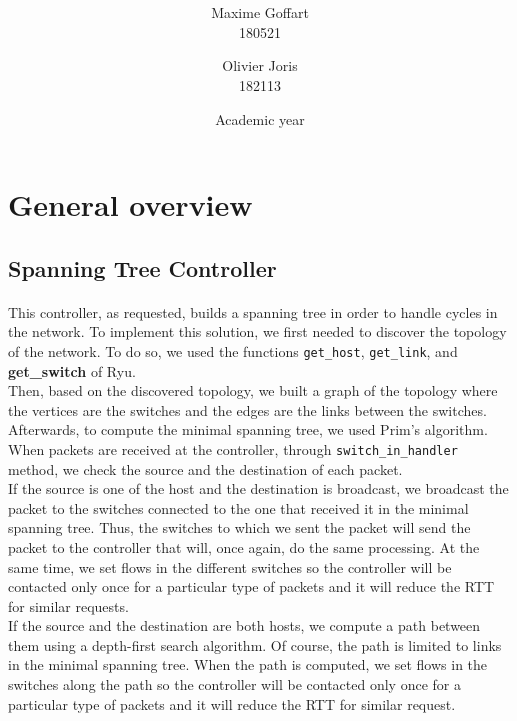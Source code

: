 \documentclass[a4paper, 11pt, oneside]{article}
\title{\ClassName\\\vspace*{0.8cm}\ProjectName\vspace{1cm}}
\author{Maxime Goffart \\180521 \and Olivier Joris\\182113}
\date{\vspace{1cm}Academic year \AcademicYear}
\begin{document}
\begin{titlingpage}
{\let\newpage\relax\maketitle}
\end{titlingpage}

\thispagestyle{empty}
\newpage


\section{General overview}

\subsection{Spanning Tree Controller}
\paragraph{}This controller, as requested, builds a spanning tree in order to handle cycles in the network. To implement this solution, we first needed to discover the topology of the network. To do so, we used the functions \texttt{get\_host}, \texttt{get\_link}, and \textbf{get\_switch} of Ryu.\\
Then, based on the discovered topology, we built a graph of the topology where the vertices are the switches and the edges are the links between the switches. Afterwards, to compute the minimal spanning tree, we used Prim's algorithm.\\
\indent When packets are received at the controller, through \texttt{switch\_in\_handler} method, we check the source and the destination of each packet.\\
If the source is one of the host and the destination is broadcast, we broadcast the packet to the switches connected to the one that received it in the minimal spanning tree. Thus, the switches to which we sent the packet will send the packet to the controller that will, once again, do the same processing. At the same time, we set flows in the different switches so the controller will be contacted only once for a particular type of packets and it will reduce the RTT for similar requests.\\
If the source and the destination are both hosts, we compute a path between them using a depth-first search algorithm. Of course, the path is limited to links in the minimal spanning tree. When the path is computed, we set flows in the switches along the path so the controller will be contacted only once for a particular type of packets and it will reduce the RTT for similar request.
\end{document}
